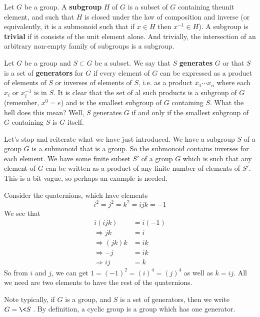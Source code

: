 Let $G$ be a group. A \textbf{subgroup} $H$
of $G$ is a subset of $G$ containing theunit element, and
such that $H$ is closed under the law of composition and
inverse (or equivalently, it is a submonoid such that if
$x\in H$ then $x^{-1}\in H$). A subgroup is
\textbf{trivial} if it consists of
the unit element alone. And trivially, the intersection of
an arbitrary non-empty family of subgroups is a subgroup.

Let $G$ be a group and $S\subset G$ be a subset. We say that
$S$ \textbf{generates} $G$ or that $S$ is a set of
\textbf{generators} for $G$ if every element of $G$ can be
expressed as a product of elements of $S$ or inverses of
elements of $S$, i.e. as a product $x_1\cdots x_n$ where
each $x_i$ or $x_{i}^{-1}$ is in $S$. It is clear that the
set of al such products is a subgroup of $G$ (remember,
$x^0=e$) and is the smallest subgroup of $G$ containing
$S$. What the hell does this mean? Well, $S$ generates $G$
if and only if the smallest subgroup of $G$ containing $S$
is $G$ itself. 

Let's stop and reiterate what we have just introduced. We
have a subgroup $S$ of a group $G$ is a submonoid that is a
group. So the submonoid contains inverses for each element.
We have some finite subset $S'$ of a group $G$ which is such that
any element of $G$ can be written as a product of any finite
number of elements of $S'$. This is a bit vague, so perhaps
an example is needed. 

\begin{ex}
Consider the quaternions, which have elements
\begin{equation}
i^2=j^2=k^2=ijk=-1
\end{equation}
We see that
\begin{align*}
i(ijk) &= i(-1)\\
\Rightarrow jk &= i\\
\Rightarrow (jk)k &= ik\\
\Rightarrow -j &= ik\\
\Rightarrow ij &= k
\end{align*}
So from $i$ and $j$, we can get $1=(-1)^2=(i)^4=(j)^4$ as
well as $k=ij$. All we need are two elements to have the
rest of the quaternions. \qef
\end{ex}

Note typically, if $G$ is a group, and $S$ is a set of
generators, then we write $G=\<S\>$. By 
definition, a cyclic group is a group which has one
generator.

